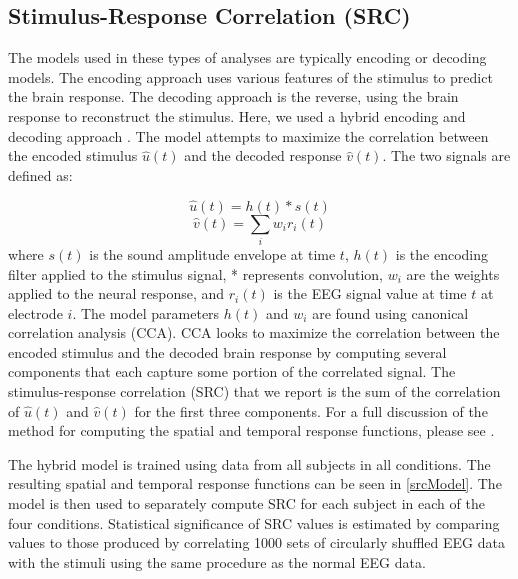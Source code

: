 \documentclass[10pt,letterpaper]{article}
\begin{document}
\subsection{Stimulus-Response Correlation (SRC)}


  The models used in these types of analyses are typically encoding or 
  decoding models. The encoding approach uses various features of the 
  stimulus to predict the brain response. The decoding approach is the reverse,
  using the brain response to reconstruct the stimulus. Here, we used a 
  hybrid encoding and decoding approach \cite{Dmochowski2017}. The model 
  attempts to maximize the correlation between the encoded stimulus 
  $\hat{u}(t)$ and the decoded response $\hat{v}(t)$. The two signals 
  are defined as:
  
    $$\hat{u}(t) = h(t) * s(t)$$
    $$\hat{v}(t) = \sum_{i} w_ir_i(t)$$
  where $s(t)$ is the sound amplitude envelope at time $t$, $h(t)$ is the 
  encoding filter applied to the stimulus signal, * represents convolution, 
  $w_i$ are the weights applied to the neural response, and $r_i(t)$ is the 
  EEG signal value at time $t$ at electrode $i$. The model parameters 
  $h(t)$ and $w_i$ are found using canonical correlation analysis (CCA).
  CCA looks to maximize the correlation between the encoded stimulus and the 
  decoded brain response by computing several components that each capture
  some portion of the correlated signal. The stimulus-response correlation (SRC)
  that we report is the sum of the correlation of $\hat{u}(t)$ and $\hat{v}(t)$
  for the first three components. For a full discussion of the method for 
  computing the spatial and temporal response functions, please see 
  \cite{Dmochowski2017}.

  The hybrid model is trained using data from all subjects in all conditions. 
  The resulting spatial and temporal response functions can be seen in 
  \ref{srcModel}. The model is then used to separately compute SRC for each 
  subject in each of the four conditions. Statistical significance of SRC 
  values is estimated by comparing values to those produced by 
  correlating 1000 sets of circularly shuffled EEG data with the stimuli using 
  the same procedure as the normal EEG data.
  
\end{document}
